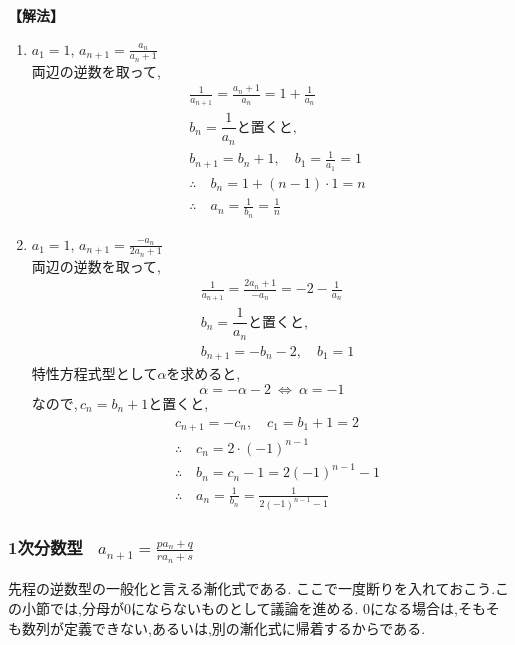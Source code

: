 \noindent\textbf{【解法】}
\begin{enumerate}[label=(\arabic*),parsep=3pt]
  \item $\displaystyle a_1=1,\, a_{n+1}=\frac{a_n}{a_n+1}$\\
        両辺の逆数を取って,
        \begin{align*}
           & \frac{1}{a_{n+1}}=\frac{a_n+1}{a_n}=1+\frac{1}{a_n} \\
           & \text{$b_n=\dfrac{1}{a_n}$と置くと,}                    \\
           & b_{n+1}=b_n+1,\quad b_1=\frac{1}{a_1}=1             \\
           & \therefore \quad b_n=1+(n-1)\cdot1=n                \\
           & \therefore \quad a_n=\frac{1}{b_n}=\frac{1}{n}
        \end{align*}
  \item $\displaystyle a_1=1,\, a_{n+1}=\frac{-a_n}{2a_n+1}$\\
        両辺の逆数を取って,
        \begin{align*}
           & \frac{1}{a_{n+1}}=\frac{2a_n+1}{-a_n}=-2-\frac{1}{a_n} \\
           & \text{$b_n=\dfrac{1}{a_n}$と置くと,}                       \\
           & b_{n+1}=-b_n-2,\quad b_1=1
        \end{align*}
        特性方程式型として$\alpha$を求めると,
        \[
          \alpha=-\alpha-2 \ \Leftrightarrow\ \alpha=-1
        \]
        なので,\,$c_n=b_n+1$と置くと,
        \begin{align*}
           & c_{n+1}=-c_n,\quad c_1=b_1+1=2                             \\
           & \therefore \quad c_n=2\cdot(-1)^{n-1}                      \\
           & \therefore \quad b_n=c_n-1=2(-1)^{n-1}-1                   \\
           & \therefore \quad a_n=\frac{1}{b_n}=\frac{1}{2(-1)^{n-1}-1}
        \end{align*}
\end{enumerate}
\subsubsection{1次分数型 \, $\displaystyle a_{n+1}=\frac{pa_n+q}{ra_n+s}$}
先程の逆数型の一般化と言える漸化式である.
ここで一度断りを入れておこう.この小節では,分母が0にならないものとして議論を進める.
0になる場合は,そもそも数列が定義できない,あるいは,別の漸化式に帰着するからである.

